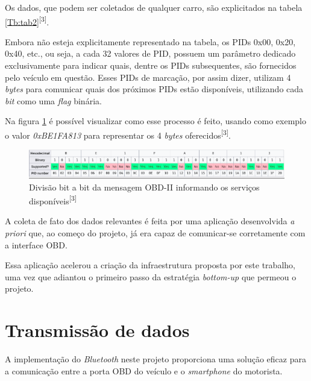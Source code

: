 Os dados, que podem ser coletados de qualquer carro, são explicitados na tabela \ref{Tb:tab2}\textsuperscript{[3]}.





Embora não esteja explicitamente representado na tabela, os PIDs 0x00, 0x20, 0x40, etc., ou seja, a cada 32 valores de PID, possuem um parâmetro dedicado exclusivamente para indicar quais, dentre os PIDs subsequentes, são fornecidos pelo veículo em questão. Esses PIDs de marcação, por assim dizer, utilizam 4 \textit{bytes} para comunicar quais dos próximos PIDs estão disponíveis, utilizando cada \textit{bit} como uma \textit{flag} binária. 

Na figura \ref{fig:bitwise_obd2} é possível visualizar como esse processo é feito, usando como exemplo o valor \textit{0xBE1FA813} para representar os 4 \textit{bytes} oferecidos\textsuperscript{[3]}.

\begin{figure}[hp]
    \centering
    
    \includegraphics[scale=0.7]{figures/tabela_dados_disponiveis.png}
    
    \caption{Divisão bit a bit da mensagem OBD-II informando os serviços disponíveis\textsuperscript{[3]}}
    
    \label{fig:bitwise_obd2}
\end{figure}


A coleta de fato dos dados relevantes é feita por uma aplicação desenvolvida \textit{a priori} que, ao começo do projeto, já era capaz de comunicar-se corretamente com a interface OBD.

Essa aplicação acelerou a criação da infraestrutura proposta por este trabalho, uma vez que adiantou o primeiro passo da estratégia \textit{bottom-up} que permeou o projeto.



\section{Transmissão de dados}

A implementação do \textit{Bluetooth} neste projeto proporciona uma solução eficaz para a comunicação entre a porta OBD do veículo e o \textit{smartphone} do motorista. 


